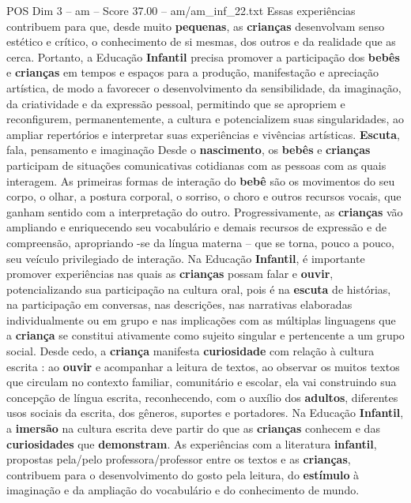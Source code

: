 \begin{textsample}{POS Dim 3 – am – Score 37.00 – am/am\_inf\_22.txt}
Essas experiências contribuem para que, desde muito \textbf{pequenas}, as \textbf{crianças} desenvolvam senso estético e crítico, o conhecimento de si mesmas, dos outros e da realidade que as cerca.
Portanto, a Educação \textbf{Infantil} precisa promover a participação dos \textbf{bebês} e \textbf{crianças} em tempos e espaços para a produção, manifestação e apreciação artística, de modo a favorecer o desenvolvimento da sensibilidade, da imaginação, da criatividade e da expressão pessoal, permitindo que se apropriem e reconfigurem, permanentemente, a cultura e potencializem suas singularidades, ao ampliar repertórios e interpretar suas experiências e vivências artísticas. \textbf{Escuta}, fala, pensamento e imaginação Desde o \textbf{nascimento}, os \textbf{bebês} e \textbf{crianças} participam de situações comunicativas cotidianas com as pessoas com as quais interagem.
As primeiras formas de interação do \textbf{bebê} são os movimentos do seu corpo, o olhar, a postura corporal, o sorriso, o choro e outros recursos vocais, que ganham sentido com a interpretação do outro.
Progressivamente, as \textbf{crianças} vão ampliando e enriquecendo seu vocabulário e demais recursos de expressão e de compreensão, apropriando -se da língua materna – que se torna, pouco a pouco, seu veículo privilegiado de interação.
Na Educação \textbf{Infantil}, é importante promover experiências nas quais as \textbf{crianças} possam falar e \textbf{ouvir}, potencializando sua participação na cultura oral, pois é na \textbf{escuta} de histórias, na participação em conversas, nas descrições, nas narrativas elaboradas individualmente ou em grupo e nas implicações com as múltiplas linguagens que a \textbf{criança} se constitui ativamente como sujeito singular e pertencente a um grupo social.
Desde cedo, a \textbf{criança} manifesta \textbf{curiosidade} com relação à cultura escrita : ao \textbf{ouvir} e acompanhar a leitura de textos, ao observar os muitos textos que circulam no contexto familiar, comunitário e escolar, ela vai construindo sua concepção de língua escrita, reconhecendo, com o auxílio dos \textbf{adultos}, diferentes usos sociais da escrita, dos gêneros, suportes e portadores.
Na Educação \textbf{Infantil}, a \textbf{imersão} na cultura escrita deve partir do que as \textbf{crianças} conhecem e das \textbf{curiosidades} que \textbf{demonstram}.
As experiências com a literatura \textbf{infantil}, propostas pela/pelo professora/professor entre os textos e as \textbf{crianças}, contribuem para o desenvolvimento do gosto pela leitura, do \textbf{estímulo} à imaginação e da ampliação do vocabulário e do conhecimento de mundo.

\end{textsample}
